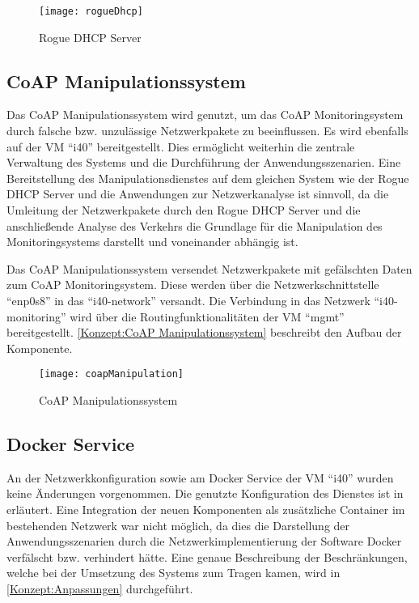 \begin{figure}[h]
  \centering
  \texttt{[image: rogueDhcp]}
  \caption{Rogue DHCP Server} 
  \label{Konzept:Rogue DHCP Server}
\end{figure}

\subsection{\ac{CoAP} Manipulationssystem}
Das \ac{CoAP} Manipulationssystem wird genutzt, um das \ac{CoAP} Monitoringsystem durch falsche bzw. unzulässige Netzwerkpakete zu beeinflussen. Es wird ebenfalls auf der \ac{VM} "`i40"' bereitgestellt. Dies ermöglicht weiterhin die zentrale Verwaltung des Systems und die Durchführung der Anwendungsszenarien. Eine Bereitstellung des Manipulationsdienstes auf dem gleichen System wie der Rogue \ac{DHCP} Server und die Anwendungen zur Netzwerkanalyse ist sinnvoll, da die Umleitung der Netzwerkpakete durch den Rogue \ac{DHCP} Server und die anschließende Analyse des Verkehrs die Grundlage für die Manipulation des Monitoringsystems darstellt und voneinander abhängig ist.

Das \ac{CoAP} Manipulationssystem versendet Netzwerkpakete mit gefälschten Daten zum \ac{CoAP} Monitoringsystem. Diese werden über die Netzwerkschnittstelle "`enp0s8"' in das "`i40-network"' versandt. Die Verbindung in das Netzwerk "`i40-monitoring"' wird über die Routingfunktionalitäten der \ac{VM} "`mgmt"' bereitgestellt. \autoref{Konzept:CoAP Manipulationssystem} beschreibt den Aufbau der Komponente.

\begin{figure}[h]
  \centering
  \texttt{[image: coapManipulation]}
  \caption{CoAP Manipulationssystem} 
  \label{Konzept:CoAP Manipulationssystem}
\end{figure}

\subsection{Docker Service}
An der Netzwerkkonfiguration sowie am Docker Service der \ac{VM} "`i40"' wurden keine Änderungen vorgenommen. Die genutzte Konfiguration des Dienstes ist in \cite{Weber2018} erläutert. Eine Integration der neuen Komponenten als zusätzliche Container im bestehenden Netzwerk war nicht möglich, da dies die Darstellung der Anwendungsszenarien durch die Netzwerkimplementierung der Software Docker verfälscht bzw. verhindert hätte. Eine genaue Beschreibung der Beschränkungen, welche bei der Umsetzung des Systems zum Tragen kamen, wird in \autoref{Konzept:Anpassungen} durchgeführt.

